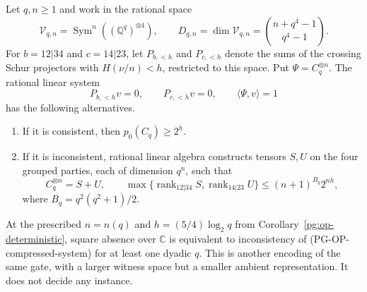 \begin{proposition}
\label{pg:op-compressed}
Let $q,n\geq1$ and work in the rational space
\[
 \mathcal V_{q,n}=\operatorname{Sym}^n((\mathbb Q^q)^{\otimes4}),
 \qquad
 D_{q,n}=\dim\mathcal V_{q,n}
        =\binom{n+q^4-1}{q^4-1}.
\]
For $b=12|34$ and $c=14|23$, let $P_{b,<h}$ and $P_{c,<h}$ denote the
sums of the crossing Schur projectors with $H(\nu/n)<h$, restricted to
this space. Put $\Psi=C_q^{\otimes n}$. The rational linear system
\[
 P_{b,<h}v=0,\qquad P_{c,<h}v=0,
 \qquad\langle\Psi,v\rangle=1
 \tag{PG-OP-compressed-system}
\]
has the following alternatives.
\begin{enumerate}
\item If it is consistent, then $p_0(C_q)\geq2^h$.
\item If it is inconsistent, rational linear algebra constructs tensors
$S,U$ on the four grouped parties, each of dimension $q^n$, such that
\[
 C_q^{\otimes n}=S+U,
 \qquad
 \max\{\operatorname{rank}_{12|34}S,
          \operatorname{rank}_{14|23}U\}
 \leq(n+1)^{B_q}2^{nh},
 \tag{PG-OP-compressed-dual}
\]
where $B_q=q^2(q^2+1)/2$.
\end{enumerate}
At the prescribed $n=n(q)$ and $h=(5/4)\log_2q$ from
Corollary~\ref{pg:op-deterministic}, square absence over $\mathbb C$ is
equivalent to inconsistency of (PG-OP-compressed-system) for at least
one dyadic $q$. This is another encoding of the same gate, with a larger
witness space but a smaller ambient representation. It does not decide
any instance.
\end{proposition}
